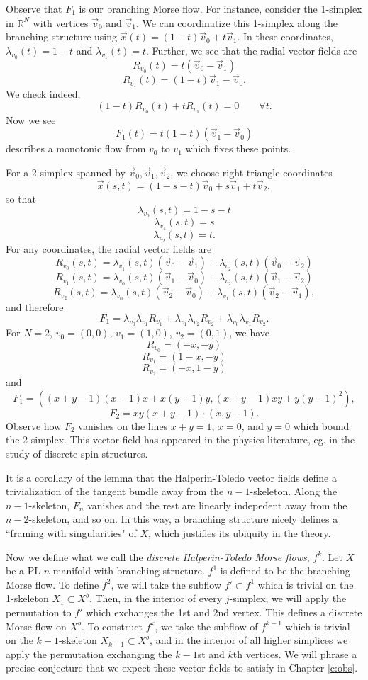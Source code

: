 \documentclass{article}
\theoremstyle{definition}
\begin{document}
Observe that $F_1$ is our branching Morse flow. For instance, consider the 1-simplex in $\mathbb{R}^N$ with vertices $\vec v_0$ and $\vec v_1$. We can coordinatize this 1-simplex along the branching structure using $\vec x(t) = (1-t) \vec v_0 + t \vec v_1$. In these coordinates, $\lambda_{v_0}(t) = 1-t$ and $\lambda_{v_1}(t) = t$. Further, we see that the radial vector fields are
\[R_{v_0}(t) = t (\vec v_0 - \vec v_1)\]
\[R_{v_1}(t) = (1-t) \vec v_1 - \vec v_0.\]
We check indeed,
\[(1-t) R_{v_0}(t) + t R_{v_1}(t) = 0 \qquad \forall t.\]
Now we see
\[F_1(t) = t(1-t) (\vec v_1 - \vec v_0)\]
describes a monotonic flow from $v_0$ to $v_1$ which fixes these points.

For a 2-simplex spanned by $\vec v_0, \vec v_1, \vec v_2$, we choose right triangle coordinates
\[\vec x(s,t) = (1- s - t)\vec v_0 + s \vec v_1 + t \vec v_2,\]
so that
\[\lambda_{v_0}(s,t) = 1-s-t\]
\[\lambda_{v_1}(s,t) = s\]
\[\lambda_{v_2}(s,t) = t.\]
For any coordinates, the radial vector fields are
\[R_{v_0}(s,t) = \lambda_{v_1}(s,t) (\vec v_0 - \vec v_1) + \lambda_{v_2}(s,t) (\vec v_0 - \vec v_2)\]
\[R_{v_1}(s,t) = \lambda_{v_0}(s,t) (\vec v_1 - \vec v_0)+ \lambda_{v_2}(s,t) (\vec v_1 - \vec v_2)\]
\[R_{v_2}(s,t) = \lambda_{v_0}(s,t)(\vec v_2 - \vec v_0) + \lambda_{v_1}(s,t)(\vec v_2 - \vec v_1),\]
and therefore
\[F_1 = \lambda_{v_0} \lambda_{v_1} R_{v_1} + \lambda_{v_1} \lambda_{v_2} R_{v_2} + \lambda_{v_0} \lambda_{v_1} R_{v_2}.\]
For $N = 2$, $v_0 = (0,0)$, $v_1 = (1,0)$, $v_2 = (0,1)$, we have
\[R_{v_0} = (-x,-y)\]
\[R_{v_1} = (1-x,-y)\]
\[R_{v_2} = (-x,1-y)\]
and
\[F_1 = ((x + y - 1)(x - 1)x + x(y - 1)y, (x + y - 1)xy + y(y - 1)^2),\]
\[F_2 = xy(x+y-1) \cdot (x, y - 1).\]
Observe how $F_2$ vanishes on the lines $x+y = 1$, $x = 0$, and $y = 0$ which bound the 2-simplex. This vector field has appeared in the physics literature, eg. \cite{gaiottokapustin} in the study of discrete spin structures.

It is a corollary of the lemma that the Halperin-Toledo vector fields define a trivialization of the tangent bundle away from the $n-1$-skeleton. Along the $n-1$-skeleton, $F_n$ vanishes and the rest are linearly indepedent away from the $n-2$-skeleton, and so on. In this way, a branching structure nicely defines a ``framing with singularities" of $X$, which justifies its ubiquity in the theory.

Now we define what we call the \emph{discrete Halperin-Toledo Morse flows}, $f^k$. Let $X$ be a PL $n$-manifold with branching structure. $f^1$ is defined to be the branching Morse flow. To define $f^2$, we will take the subflow $f' \subset f^1$ which is trivial on the 1-skeleton $X_1 \subset X^b$. Then, in the interior of every $j$-simplex, we will apply the permutation to $f'$ which exchanges the 1st and 2nd vertex. This defines a discrete Morse flow on $X^b$. To construct $f^k$, we take the subflow of $f^{k-1}$ which is trivial on the $k-1$-skeleton $X_{k-1} \subset X^b$, and in the interior of all higher simplices we apply the permutation exchanging the $k-1$st and $k$th vertices. We will phrase a precise conjecture that we expect these vector fields to satisfy in Chapter \ref{c:obs}.
\end{document}
